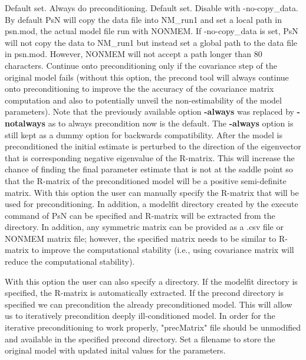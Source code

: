 \begin{optionlist}
Default set. Always do preconditioning.
\nextopt	
{}
Default set. Disable with -no-copy\_data. By default PsN will copy the data file into NM\_run1 and set a local path in psn.mod, the actual model file run with NONMEM. If -no-copy\_data is set, PsN will not copy the data to NM\_run1 but instead set a global path to the data file in psn.mod. However, NONMEM will not accept a path longer than 80 characters.
\nextopt
{}
Continue onto preconditioning only if the covariance step of the original model fails (without this option, the precond tool will always continue onto preconditioning to improve the the accuracy of the covariance matrix computation and also to potentially unveil the non-estimability of the model parameters). Note that the previously available option {\bf -always} was replaced by {\bf -notalways} as to always precondition now is the default. The {\bf -always} option is still kept as a dummy option for backwards compatibility.
\nextopt
{}
After the model is preconditioned the initial estimate is perturbed to the direction of the eigenvector that is corresponding negative eigenvalue of the R-matrix.  This will increase the chance of finding the final parameter estimate that is not at the saddle point so that the R-matrix of the preconditioned model will be a positive semi-definite matrix.
\nextopt
{}
With this option the user can manually specify the R-matrix that will be used for preconditioning. In addition, a modelfit directory created by the execute command of PsN can be specified and R-matrix will be extracted from the directory.  In addition, any symmetric matrix can be provided as a .csv file or NONMEM matrix file; however, the specified matrix needs to be similar to R-matrix to improve the computational stability (i.e., using covariance matrix will reduce the computational stability).

With this option the user can also specify a directory. If the modelfit directory is specified, the R-matrix is automatically extracted.  If the precond directory is specified we can precondition the already preconditioned model. This will allow us to iteratively precondition deeply ill-conditioned model. In order for the iterative preconditioning to work properly, "precMatrix" file should be unmodified and available in the specified precond directory.
\nextopt
{}
Set a filename to store the original model with updated inital values for the parameters.	
\nextopt

\end{optionlist}

